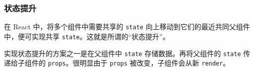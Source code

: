 \subsubsection*{状态提升}

在 React 中，将多个组件中需要共享的 \texttt{state} 向上移动到它们的最近共同父组件中，便可实现共享 \texttt{state}。这就是所谓的“状态提升”。

实现状态提升的方案之一是在父组件中 \texttt{state} 存储数据。再将父组件的 \texttt{state} 传递给子组件的 \texttt{props}。很明显由于 \texttt{props} 被改变，子组件会从新 \texttt{render}。

\newpage